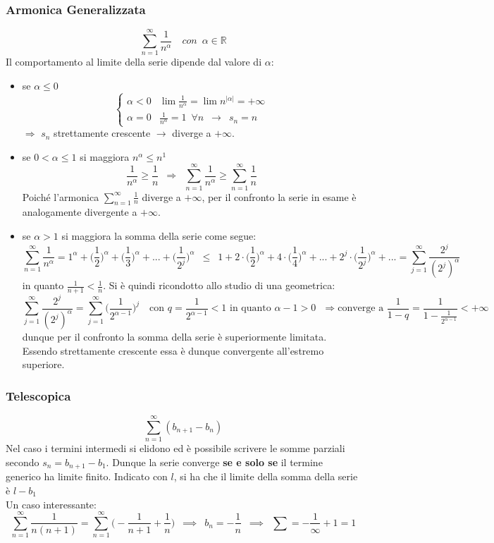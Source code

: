 \documentclass[10pt]{article}
\theoremstyle{plain}
\begin{document}
\subsubsection{Armonica Generalizzata}
\[\sum \limits_{n=1}^{\infty} \frac{1}{n^\alpha} \quad con \enspace \alpha \in \mathbb{R}\]
Il comportamento al limite della serie dipende dal valore di $\alpha$:
\begin{itemize}[label=$\ast$]
    \item se $\alpha \leq 0$\\
    \[\begin{cases}
        \alpha < 0 & \lim \frac{1}{n^\alpha} = \lim n^{|\alpha|} = + \infty \\
        \alpha = 0 & \frac{1}{n^\alpha} = 1 \enspace \forall n \enspace \rightarrow \enspace s_n = n
    \end{cases}
    \]
    $\Rightarrow$ $s_n$ strettamente crescente $\rightarrow$ diverge a $+ \infty$.
    \item se $0 < \alpha \leq 1$ si maggiora $n^\alpha \leq n^1$
    \[\frac{1}{n^\alpha} \geq \frac{1}{n} \enspace \Rightarrow \enspace \sum \limits_{n=1}^{\infty} \frac{1}{n^\alpha} \geq \sum \limits_{n=1}^{\infty} \frac{1}{n}\]
    Poiché l'armonica $\sum_{n=1}^{\infty} \frac{1}{n}$ diverge a $+ \infty$, per il confronto la serie in esame è analogamente divergente a $+\infty$.
    \item se $\alpha > 1$ si maggiora la somma della serie come segue:
    \[\sum \limits_{n=1}^{\infty} \frac{1}{n^\alpha} = 1^\alpha + \bigg(\frac{1}{2}\bigg)^\alpha + \bigg(\frac{1}{3}\bigg)^\alpha + ... + \bigg(\frac{1}{2^j}\bigg)^\alpha \enspace \leq \enspace 1+ 2\cdot \bigg(\frac{1}{2}\bigg)^\alpha + 4\cdot \bigg(\frac{1}{4}\bigg)^\alpha + ... + 2^j\cdot \bigg(\frac{1}{2^j}\bigg)^\alpha + ... = \sum \limits_{j=1}^{\infty} \frac{2^j}{(2^j)^\alpha}\]
    in quanto $\frac{1}{n+1} < \frac{1}{n}$. Si è quindi ricondotto allo studio di una geometrica:
    \[\sum \limits_{j=1}^{\infty} \frac{2^j}{(2^j)^\alpha} = \sum \limits_{j=1}^{\infty} \bigg(\frac{1}{2^{\alpha-1}}\bigg)^j \quad \textrm{con $q = \frac{1}{2^{\alpha-1}} < 1$ in quanto $\alpha - 1 > 0$ } \Rightarrow \textrm{converge a } \frac{1}{1-q} = \frac{1}{1 - \frac{1}{2^{\alpha-1}}} < + \infty\]
    dunque per il confronto la somma della serie è superiormente limitata. Essendo strettamente crescente essa è dunque convergente all'estremo superiore.
\end{itemize}

\subsubsection{Telescopica}
\[\sum \limits_{n=1}^{\infty} (b_{n+1} - b_n)\]
Nel caso i termini intermedi si elidono ed è possibile scrivere le somme parziali secondo $s_n = b_{n+1} - b_1$. Dunque la serie converge \textbf{se e solo se} il termine generico ha limite finito. Indicato con $l$, si ha che il limite della somma della serie è $l - b_1$
\\Un caso interessante:
\[\sum \limits_{n=1}^{\infty} \frac{1}{n (n+1)} = \sum \limits_{n=1}^{\infty} \bigg(-\frac{1}{n+1} + \frac{1}{n}\bigg) \enspace \implies \enspace b_n = - \frac{1}{n} \enspace \implies \enspace \sum = - \frac{1}{\infty} + 1 = 1\]
\end{document}

